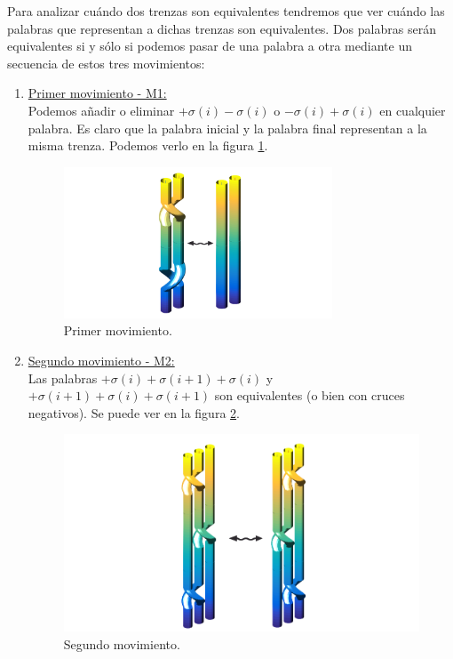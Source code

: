 \documentclass[14pt]{extarticle}
\begin{document}
	Para analizar cuándo dos trenzas son equivalentes tendremos que ver cuándo las palabras que representan a dichas trenzas son equivalentes. Dos palabras serán equivalentes si y sólo si podemos pasar de una palabra a otra mediante un secuencia de estos tres movimientos:
	\begin{enumerate}
		\item \underline{Primer movimiento - M1:} \\
		Podemos añadir o eliminar $+\sigma(i) -\sigma(i)$ o $-\sigma(i) +\sigma(i)$ en cualquier palabra. Es claro que la palabra inicial y la palabra final representan a la misma trenza. Podemos verlo en la figura \ref{tren6}.
		\begin{figure}[h!]
			\centering
			\includegraphics[width=8cm]{itrenzas/M1.png}
			\caption{Primer movimiento.}
			\label{tren6} 
		\end{figure}
		
		\item \underline{Segundo movimiento - M2:} \\
		Las palabras $+\sigma(i) +\sigma(i+1) +\sigma(i)$ y $+\sigma(i+1) +\sigma(i) +\sigma(i+1)$ son equivalentes (o bien con cruces negativos). Se puede ver en la figura \ref{tren7}.
		\begin{figure}[h!]
			\centering
			\includegraphics[width=13cm]{itrenzas/M2.png}
			\caption{Segundo movimiento.}
			\label{tren7} 
		\end{figure}
		

\end{enumerate}
\end{document}
